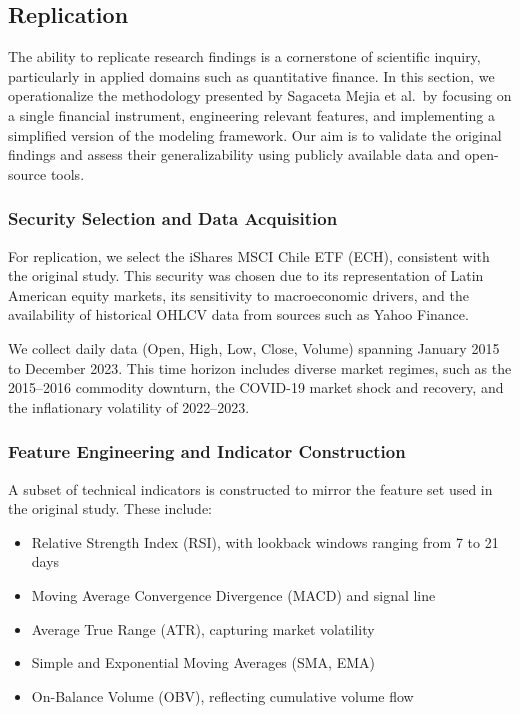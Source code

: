 \subsection{Replication}

The ability to replicate research findings is a cornerstone of scientific inquiry, particularly in applied domains such as quantitative finance. In this section, we operationalize the methodology presented by Sagaceta Mejia et al.\ by focusing on a single financial instrument, engineering relevant features, and implementing a simplified version of the modeling framework. Our aim is to validate the original findings and assess their generalizability using publicly available data and open-source tools.

\subsubsection{Security Selection and Data Acquisition}

For replication, we select the iShares MSCI Chile ETF (ECH), consistent with the original study. This security was chosen due to its representation of Latin American equity markets, its sensitivity to macroeconomic drivers, and the availability of historical OHLCV data from sources such as Yahoo Finance.

We collect daily data (Open, High, Low, Close, Volume) spanning January 2015 to December 2023. This time horizon includes diverse market regimes, such as the 2015–2016 commodity downturn, the COVID-19 market shock and recovery, and the inflationary volatility of 2022–2023.

\subsubsection{Feature Engineering and Indicator Construction}

A subset of technical indicators is constructed to mirror the feature set used in the original study. These include:

\begin{itemize}
  \item Relative Strength Index (RSI), with lookback windows ranging from 7 to 21 days
  \item Moving Average Convergence Divergence (MACD) and signal line
  \item Average True Range (ATR), capturing market volatility
  \item Simple and Exponential Moving Averages (SMA, EMA)
  \item On-Balance Volume (OBV), reflecting cumulative volume flow
\end{itemize}

